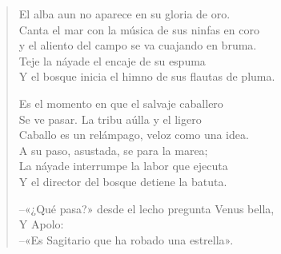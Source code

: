 \documentclass[12pt]{article}
\begin{document}
\clearpage
{}
\begin{verse}

El alba aun no aparece en su gloria de oro.\\
Canta el mar con la música de sus ninfas en coro\\
y el aliento del campo se va cuajando en bruma.\\
Teje la náyade el encaje de su espuma\\
Y el bosque inicia el himno de sus flautas de pluma.  

Es el momento en que el salvaje caballero\\
Se ve pasar. La tribu aúlla y el ligero\\
Caballo es un relámpago, veloz como una idea.\\
A su paso, asustada, se para la marea;\\
La náyade interrumpe la labor que ejecuta\\
Y el director del bosque detiene la batuta.  

--«¿Qué pasa?» desde el lecho pregunta Venus bella,\\
Y Apolo:\\
--«Es Sagitario que ha robado una estrella».  

\end{verse}
\end{document}
